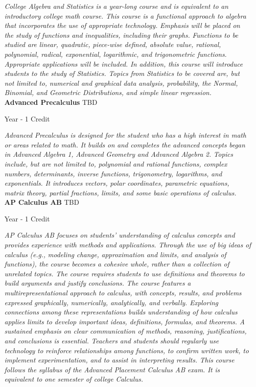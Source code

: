 \vspace{1mm}\emph{College Algebra and Statistics is a year-long course and is equivalent to an introductory college math course. This course is a functional approach to algebra that incorporates the use of appropriate technology. Emphasis will be placed on the study of functions and inequalities, including their graphs. Functions to be studied are linear, quadratic, piece-wise defined, absolute value, rational, polynomial, radical, exponential, logarithmic, and trigonometric functions. Appropriate applications will be included. In addition, this course will introduce students to the study of Statistics. Topics from Statistics to be covered are, but not limited to, numerical and graphical data analysis, probability, the Normal, Binomial, and Geometric Distributions, and simple linear regression.}\\

\noindent\textbf{Advanced Precalculus} \hfill TBD

\noindent Year - 1 Credit

\vspace{1mm}\emph{Advanced Precalculus is designed for the student who has a high interest in math or areas related to math. It builds on and completes the advanced concepts began in Advanced Algebra 1, Advanced Geometry and Advanced Algebra 2. Topics include, but are not limited to, polynomial and rational functions, complex numbers, determinants, inverse functions, trigonometry, logarithms, and exponentials. It introduces vectors, polar coordinates, parametric equations, matrix theory, partial fractions, limits, and some basic operations of calculus. }\\

\noindent\textbf{AP Calculus AB} \hfill TBD

\noindent Year - 1 Credit

\vspace{1mm}\emph{AP Calculus AB focuses on students’ understanding of calculus concepts and provides experience with methods and applications. Through the use of big ideas of calculus (e.g., modeling change, approximation and limits, and analysis of functions), the course becomes a cohesive whole, rather than a collection of unrelated topics. The course requires students to use definitions and theorems to build arguments and justify conclusions. The course features a multirepresentational approach to calculus, with concepts, results, and problems expressed graphically, numerically, analytically, and verbally. Exploring connections among these representations builds understanding of how calculus applies limits to develop important ideas, definitions, formulas, and theorems. A sustained emphasis on clear communication of methods, reasoning, justifications, and conclusions is essential. Teachers and students should regularly use technology to reinforce relationships among functions, to confirm written work, to implement experimentation, and to assist in interpreting results. This course follows the syllabus of the Advanced Placement Calculus AB exam. It is equivalent to one semester of college Calculus.}\\

